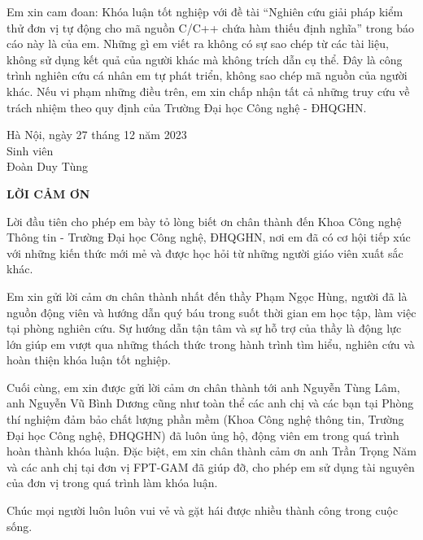 Em xin cam đoan: Khóa luận tốt nghiệp với đề tài “Nghiên cứu giải pháp kiểm thử đơn vị tự động cho mã nguồn C/C++ chứa hàm thiếu định nghĩa” trong báo cáo này là của em. Những gì em viết ra không có sự sao chép từ các tài liệu, không sử dụng kết quả của người khác mà không trích dẫn cụ thể. Đây là công trình nghiên cứu cá nhân em tự phát triển, không sao chép mã nguồn của người khác. Nếu vi phạm những điều trên, em xin chấp nhận tất cả những truy cứu về trách nhiệm theo quy định của Trường Đại học Công nghệ - ĐHQGHN.

\begin{flushright}
	\begin{varwidth}{\linewidth}\centering
		Hà Nội, ngày 27 tháng 12 năm 2023\\
		Sinh viên\\[2cm]
		Đoàn Duy Tùng
	\end{varwidth}
\end{flushright}

\newpage

\begin{center}
    \textbf{LỜI CẢM ƠN}
\end{center}

Lời đầu tiên cho phép em bày tỏ lòng biết ơn chân thành đến  Khoa Công nghệ Thông tin - Trường Đại học Công nghệ, ĐHQGHN, nơi em đã có cơ hội tiếp xúc với những kiến thức mới mẻ và được học hỏi từ những người giáo viên xuất sắc khác.

Em xin gửi lời cảm ơn chân thành nhất đến thầy Phạm Ngọc Hùng, người đã là nguồn động viên và hướng dẫn quý báu trong suốt thời gian em học tập, làm việc tại phòng nghiên cứu. Sự hướng dẫn tận tâm và sự hỗ trợ của thầy là động lực lớn giúp em vượt qua những thách thức trong hành trình tìm hiểu, nghiên cứu và hoàn thiện khóa luận tốt nghiệp.

Cuối cùng, em xin được gửi lời cảm ơn chân thành tới anh Nguyễn Tùng Lâm, anh Nguyễn Vũ Bình Dương cũng như toàn thể các anh chị và các bạn tại Phòng thí nghiệm đảm bảo chất lượng phần mềm (Khoa Công nghệ thông tin, Trường Đại học Công nghệ, ĐHQGHN) đã luôn ủng hộ, động viên em trong quá trình hoàn thành khóa luận. Đặc biệt, em xin chân thành cảm ơn anh Trần Trọng Năm và các anh chị tại đơn vị FPT-GAM đã giúp đỡ, cho phép em sử dụng tài nguyên của đơn vị trong quá trình làm khóa luận.

Chúc mọi người luôn luôn vui vẻ và gặt hái được nhiều thành công trong cuộc sống.


